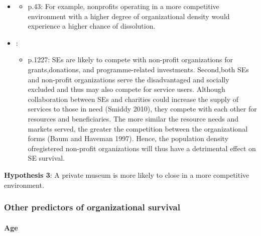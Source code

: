 \documentclass[12pt]{article}
\begin{document}
\begin{itemize}
\begin{itemize}
\end{itemize}
\item \cite{Lu_Shon_Zhang_2019_dissolution}
\begin{itemize}
\item p.43: For example, nonprofits operating in a more competitive environment with a higher degree of organizational density would experience a higher chance of dissolution.
\end{itemize}
\item \cite{Haugh_etal_2021_nascent}:
\begin{itemize}
\item p.1227: SEs are likely to compete with non-profit organizations for grants,donations, and programme-related investments. Second,both SEs and non-profit organizations serve the disadvantaged and socially excluded and thus may also compete for service users. Although collaboration between SEs and charities could increase the supply of services to those in need (Smiddy 2010), they compete with each other for resources and beneficiaries. The more similar the resource needs and markets served, the greater the competition between the organizational forms (Baum and Haveman 1997). Hence, the population density ofregistered non-profit organizations will thus have a detrimental effect on SE survival.
\end{itemize}
\end{itemize}

\textbf{Hypothesis 3}: A private museum is more likely to close in a more competitive environment.



\subsubsection*{Other predictors of organizational survival}
\label{sec:org9672c62}
\paragraph*{Age}
\label{sec:orgae2e32a}
\end{document}

